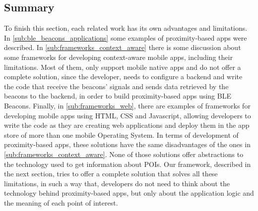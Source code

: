 \subsection{Summary}
\label{sub:summary}
To finish this section, each related work has its own
advantages and limitations.
In \ref{sub:ble_beacons_applications} some
examples of proximity-based apps were described.
In \ref{sub:frameworks_context_aware} there is
some discussion about some
frameworks for developing context-aware mobile apps,
including their limitations.
Most of them, only support mobile native apps and
do not offer a complete solution, since the developer,
needs to configure a backend and write the code that
receive the beacons' signals and sends data retrieved by 
the beacons to the backend, in order to build 
proximity-based apps using BLE Beacons.
Finally, in \ref{sub:frameworks_web}, there are
examples of frameworks for developing mobile apps
using HTML, CSS and Javascript, allowing developers
to write the code as they are creating web applications
and deploy them in the app store of more than one
mobile Operating System.
In terms of development of proximity-based apps,
these solutions have the same disadvantages of the
ones in \ref{sub:frameworks_context_aware}.
None of those solutions offer abstractions to
the technology used to get information about POIs.
Our framework, described in the next section, tries 
to offer a complete solution that solves all
these limitations, in such a way that, developers do not
need to think about the technology behind proximity-based
apps, but only about the application logic and the meaning
of each point of interest.